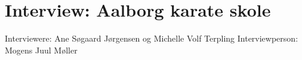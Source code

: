 \chapter{Interview: Aalborg karate skole}\label{ch:appElabel}
Interviewere: Ane Søgaard Jørgensen og Michelle Volf Terpling
Interviewperson: Mogens Juul Møller